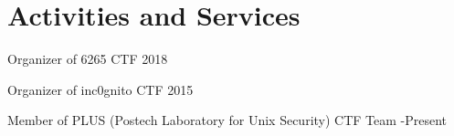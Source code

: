 \section*{Activities and Services}
\begin{description}
  \item Organizer of 6265 CTF 2018

  \item Organizer of inc0gnito CTF 2015

  \item Member of PLUS (Postech Laboratory for Unix Security) CTF Team 
  -Present
\end{description}
